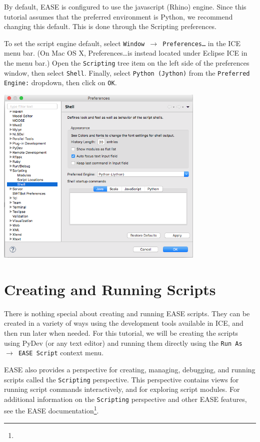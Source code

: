 \documentclass{article}
\begin{document}
By default, EASE is configured to use the javascript (Rhino) engine. Since this
tutorial assumes that the preferred environment is Python, we recommend changing
this default. This is done through the Scripting preferences.

To set the script engine default, select \texttt{Window $\rightarrow$
Preferences\ldots} in the ICE menu bar. (On Mac OS X, Preferences\ldots is
instead located under Eclipse ICE in the menu bar.) Open the \texttt{Scripting}
tree item on the left side of the preferences window, then select
\texttt{Shell}. Finally, select \texttt{Python (Jython)} from the
\texttt{Preferred Engine:} dropdown, then click on \texttt{OK}.

\begin{center}
\includegraphics[width=10cm]{images/scripting-prefs}
\end{center}


\section{Creating and Running Scripts}

There is nothing special about creating and running EASE scripts. They can be
created in a variety of ways using the development tools available in ICE, and
then run later when needed. For this tutorial, we will be creating the scripts
using PyDev (or any text editor) and running them directly using the \texttt{Run As
$\rightarrow$ EASE Script} context menu.

EASE also provides a perspective for creating, managing, debugging, and running
scripts called the \texttt{Scripting} perspective. This perspective contains
views for running script commands interactively, and for exploring script modules.
For additional information on the
\texttt{Scripting} perspective and other EASE features, see the EASE
documentation\footnote{}.
\end{document}
